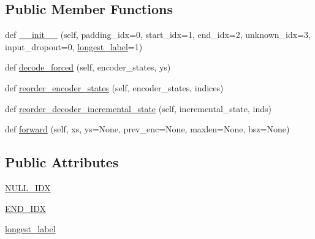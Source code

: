 \subsection*{Public Member Functions}
\begin{DoxyCompactItemize}
\item 
def \hyperlink{classparlai_1_1core_1_1torch__generator__agent_1_1TorchGeneratorModel_aaec943d5add4e6d90fdd451f740be6af}{\+\_\+\+\_\+init\+\_\+\+\_\+} (self, padding\+\_\+idx=0, start\+\_\+idx=1, end\+\_\+idx=2, unknown\+\_\+idx=3, input\+\_\+dropout=0, \hyperlink{classparlai_1_1core_1_1torch__generator__agent_1_1TorchGeneratorModel_a14dcf5ba14c4438bb4919565ebd30fa8}{longest\+\_\+label}=1)
\item 
def \hyperlink{classparlai_1_1core_1_1torch__generator__agent_1_1TorchGeneratorModel_abfc801c11be6fc49dfbc4e70dc6b8ed9}{decode\+\_\+forced} (self, encoder\+\_\+states, ys)
\item 
def \hyperlink{classparlai_1_1core_1_1torch__generator__agent_1_1TorchGeneratorModel_a9ed5aecabe977856b4c385ba74fa6107}{reorder\+\_\+encoder\+\_\+states} (self, encoder\+\_\+states, indices)
\item 
def \hyperlink{classparlai_1_1core_1_1torch__generator__agent_1_1TorchGeneratorModel_a828d2881fb73ead7d27691c73d1f6f36}{reorder\+\_\+decoder\+\_\+incremental\+\_\+state} (self, incremental\+\_\+state, inds)
\item 
def \hyperlink{classparlai_1_1core_1_1torch__generator__agent_1_1TorchGeneratorModel_a5f1915200b6a8c6518fe17889d2b7cdc}{forward} (self, xs, ys=None, prev\+\_\+enc=None, maxlen=None, bsz=None)
\end{DoxyCompactItemize}
\subsection*{Public Attributes}
\begin{DoxyCompactItemize}
\item 
\hyperlink{classparlai_1_1core_1_1torch__generator__agent_1_1TorchGeneratorModel_a686d4c12ada077cbf2b9c57544cbbe20}{N\+U\+L\+L\+\_\+\+I\+DX}
\item 
\hyperlink{classparlai_1_1core_1_1torch__generator__agent_1_1TorchGeneratorModel_a1d9cfef6046368b5e7b77bc44b13473e}{E\+N\+D\+\_\+\+I\+DX}
\item 
\hyperlink{classparlai_1_1core_1_1torch__generator__agent_1_1TorchGeneratorModel_a14dcf5ba14c4438bb4919565ebd30fa8}{longest\+\_\+label}
\end{DoxyCompactItemize}



